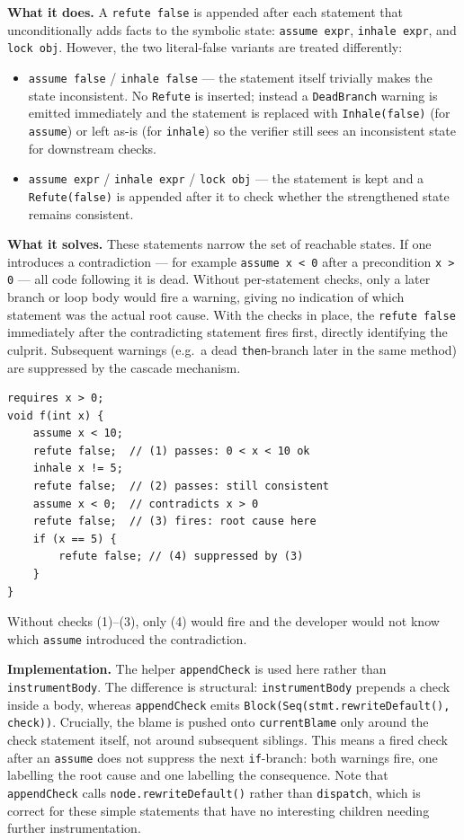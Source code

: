 \documentclass[9pt,a4paper,twocolumn]{article}
\begin{document}
\textbf{What it does.} A \texttt{refute false} is appended after
each statement that unconditionally adds facts to the symbolic
state: \texttt{assume expr}, \texttt{inhale expr}, and
\texttt{lock obj}. However, the two literal-false variants are
treated differently:

\begin{itemize}
  \item \texttt{assume false} / \texttt{inhale false} — the
    statement itself trivially makes the state inconsistent. No
    \texttt{Refute} is inserted; instead a \texttt{DeadBranch}
    warning is emitted immediately and the statement is replaced
    with \texttt{Inhale(false)} (for \texttt{assume}) or left as-is
    (for \texttt{inhale}) so the verifier still sees an
    inconsistent state for downstream checks.
  \item \texttt{assume expr} / \texttt{inhale expr} / \texttt{lock
    obj} — the statement is kept and a \texttt{Refute(false)} is
    appended after it to check whether the strengthened state
    remains consistent.
\end{itemize}

\textbf{What it solves.} These statements narrow the set of
reachable states. If one introduces a contradiction — for example
\texttt{assume x < 0} after a precondition \texttt{x > 0} — all
code following it is dead. Without per-statement checks, only a
later branch or loop body would fire a warning, giving no
indication of which statement was the actual root cause. With the
checks in place, the \texttt{refute false} immediately after the
contradicting statement fires first, directly identifying the
culprit. Subsequent warnings (e.g.\ a dead \texttt{then}-branch
later in the same method) are suppressed by the cascade mechanism.

\begin{lstlisting}
requires x > 0;
void f(int x) {
    assume x < 10;
    refute false;  // (1) passes: 0 < x < 10 ok
    inhale x != 5;
    refute false;  // (2) passes: still consistent
    assume x < 0;  // contradicts x > 0
    refute false;  // (3) fires: root cause here
    if (x == 5) {
        refute false; // (4) suppressed by (3)
    }
}
\end{lstlisting}

Without checks (1)--(3), only (4) would fire and the developer
would not know which \texttt{assume} introduced the contradiction.

\textbf{Implementation.} The helper \texttt{appendCheck} is used
here rather than \texttt{instrumentBody}. The difference is
structural: \texttt{instrumentBody} prepends a check inside a
body, whereas \texttt{appendCheck} emits
\texttt{Block(Seq(stmt.rewriteDefault(), check))}. Crucially, the
blame is pushed onto \texttt{currentBlame} only around the check
statement itself, not around subsequent siblings. This means a
fired check after an \texttt{assume} does not suppress the next
\texttt{if}-branch: both warnings fire, one labelling the root
cause and one labelling the consequence. Note that
\texttt{appendCheck} calls \texttt{node.rewriteDefault()} rather
than \texttt{dispatch}, which is correct for these simple
statements that have no interesting children needing further
instrumentation.
\end{document}

